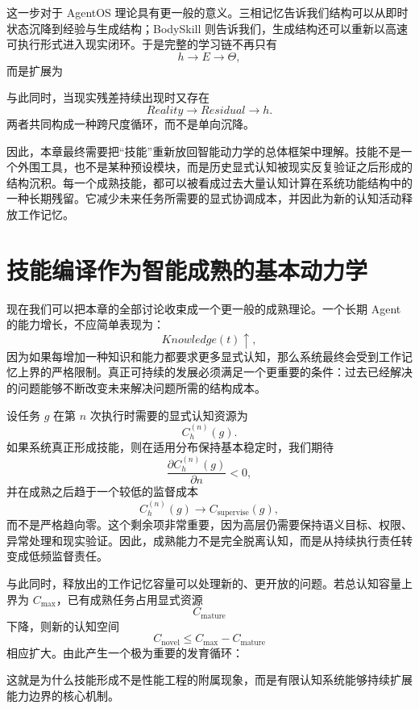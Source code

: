 这一步对于 AgentOS 理论具有更一般的意义。三相记忆告诉我们结构可以从即时状态沉降到经验与生成结构；BodySkill 则告诉我们，生成结构还可以重新以高速可执行形式进入现实闭环。于是完整的学习链不再只有
\[
h
\rightarrow
E
\rightarrow
\Theta,
\]
而是扩展为
\begin{statementbox}
\centering
{}
\end{statementbox}
与此同时，当现实残差持续出现时又存在
\[
Reality
\rightarrow
Residual
\rightarrow
h.
\]
两者共同构成一种跨尺度循环，而不是单向沉降。

因此，本章最终需要把“技能”重新放回智能动力学的总体框架中理解。技能不是一个外围工具，也不是某种预设模块，而是历史显式认知被现实反复验证之后形成的结构沉积。每一个成熟技能，都可以被看成过去大量认知计算在系统功能结构中的一种长期残留。它减少未来任务所需要的显式协调成本，并因此为新的认知活动释放工作记忆。

\section{技能编译作为智能成熟的基本动力学}

现在我们可以把本章的全部讨论收束成一个更一般的成熟理论。一个长期 Agent 的能力增长，不应简单表现为：
\[
Knowledge(t)\uparrow,
\]
因为如果每增加一种知识和能力都要求更多显式认知，那么系统最终会受到工作记忆上界的严格限制。真正可持续的发展必须满足一个更重要的条件：过去已经解决的问题能够不断改变未来解决问题所需的结构成本。

设任务 $g$ 在第 $n$ 次执行时需要的显式认知资源为
\[
C_h^{(n)}(g).
\]
如果系统真正形成技能，则在适用分布保持基本稳定时，我们期待
\[
\frac{\partial C_h^{(n)}(g)}
{\partial n}
<0,
\]
并在成熟之后趋于一个较低的监督成本
\[
C_h^{(n)}(g)
\rightarrow
C_{\mathrm{supervise}}(g),
\]
而不是严格趋向零。这个剩余项非常重要，因为高层仍需要保持语义目标、权限、异常处理和现实验证。因此，成熟能力不是完全脱离认知，而是从持续执行责任转变成低频监督责任。

与此同时，释放出的工作记忆容量可以处理新的、更开放的问题。若总认知容量上界为 $C_{\max}$，已有成熟任务占用显式资源
\[
C_{\mathrm{mature}}
\]
下降，则新的认知空间
\[
C_{\mathrm{novel}}
\leq
C_{\max}-C_{\mathrm{mature}}
\]
相应扩大。由此产生一个极为重要的发育循环：
\begin{statementbox}
\centering
{}
\end{statementbox}
这就是为什么技能形成不是性能工程的附属现象，而是有限认知系统能够持续扩展能力边界的核心机制。


